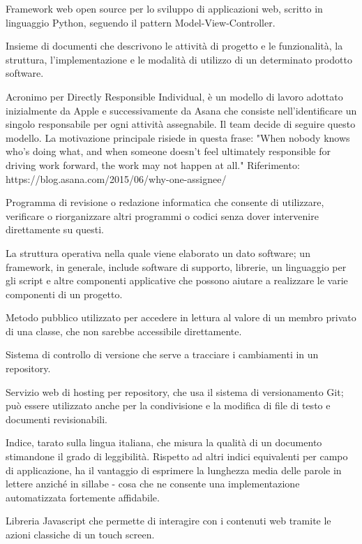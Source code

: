 \item[Django] Framework web open source per lo sviluppo di applicazioni web, scritto in linguaggio Python, seguendo il pattern Model-View-Controller.
\item[documentazione] Insieme di documenti che descrivono le attività di progetto e le funzionalità, la struttura, l'implementazione e le modalità di utilizzo di un determinato prodotto software. 
\item[DRI] Acronimo per Directly Responsible Individual, è un modello di lavoro adottato inizialmente da Apple e successivamente da Asana che consiste nell'identificare un singolo responsabile per ogni attività assegnabile. Il team decide di seguire questo modello. La motivazione principale risiede in questa frase: "When nobody knows who’s doing what, and when someone doesn’t feel ultimately responsible for driving work forward, the work may not happen at all." Riferimento: https://blog.asana.com/2015/06/why-one-assignee/ 
\item[editor] Programma di revisione o redazione informatica che consente di utilizzare, verificare o riorganizzare altri programmi o codici senza dover intervenire direttamente su questi.
\item[framework]  La struttura operativa nella quale viene elaborato un dato software; un framework, in generale, include software di supporto, librerie, un linguaggio per gli script e altre componenti applicative che possono aiutare a realizzare le varie componenti di un progetto.
\item[getter] Metodo pubblico utilizzato per accedere in lettura al valore di un membro privato di una classe, che non sarebbe accessibile direttamente.
\item[Git] Sistema di controllo di versione che serve a tracciare i cambiamenti in un repository.
\item[GitHub] Servizio web di hosting per repository, che usa il sistema di versionamento Git; può essere utilizzato anche per la condivisione e la modifica di file di testo e documenti revisionabili.
\item[Gulpease, indice di] Indice, tarato sulla lingua italiana, che misura la qualità di un documento stimandone il grado di leggibilità. Rispetto ad altri indici equivalenti per campo di applicazione, ha il vantaggio di esprimere la lunghezza media delle parole in lettere anziché in sillabe - cosa che ne consente una implementazione automatizzata fortemente affidabile. 
\item[Hammer.js] Libreria Javascript che permette di interagire con i contenuti web tramite le azioni classiche di un touch screen.
